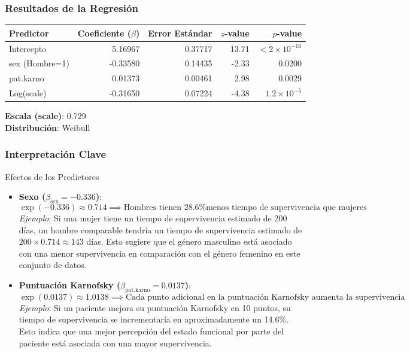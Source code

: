 \documentclass[a4paper,12pt]{article}
\begin{document}
\subsubsection*{Resultados de la Regresión}
\begin{tabular}{lrrrr}
\toprule
Predictor & Coeficiente ($\beta$) & Error Estándar & $z$-value & $p$-value \\
\midrule
Intercepto & 5.16967 & 0.37717 & 13.71 & $<2 \times 10^{-16}$ \\
sex (Hombre=1) & -0.33580 & 0.14435 & -2.33 & 0.0200 \\
pat.karno & 0.01373 & 0.00461 & 2.98 & 0.0029 \\
Log(scale) & -0.31650 & 0.07224 & -4.38 & $1.2 \times 10^{-5}$ \\
\bottomrule
\end{tabular}

\vspace{1cm}
\textbf{Escala (scale)}: 0.729 \\
\textbf{Distribución}: Weibull \\

\subsubsection*{Interpretación Clave}
Efectos de los Predictores
\begin{itemize}
\item \textbf{Sexo ($\beta_{\text{sex}} = -0.336$)}:
\begin{equation*}
\exp(-0.336) \approx 0.714 \implies \text{Hombres tienen 28.6\% menos tiempo de supervivencia que mujeres}
\end{equation*}
\textit{Ejemplo}: Si una mujer tiene un tiempo de supervivencia estimado de 200 días, un hombre comparable tendría un tiempo de supervivencia estimado de $200 \times 0.714 \approx 143$ días. Esto sugiere que el género masculino está asociado con una menor supervivencia en comparación con el género femenino en este conjunto de datos.

\item \textbf{Puntuación Karnofsky ($\beta_{\text{pat.karno}} = 0.0137$)}:
\begin{equation*}
\exp(0.0137) \approx 1.0138 \implies \text{Cada punto adicional en la puntuación Karnofsky aumenta la supervivencia en 1.38\%}
\end{equation*}
\textit{Ejemplo}: Si un paciente mejora su puntuación Karnofsky en 10 puntos, su tiempo de supervivencia se incrementaría en aproximadamente un 14.6\%. Esto indica que una mejor percepción del estado funcional por parte del paciente está asociada con una mayor supervivencia.
\end{itemize}
\end{document}
